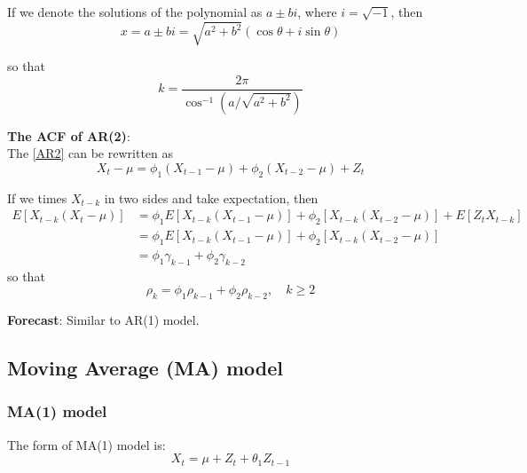 \documentclass{article}
\begin{document}
\noindent If we denote the solutions of the polynomial as $a \pm b i$, where $i = \sqrt{-1}$, then
\begin{equation*}
x = a \pm b i = \sqrt{a^2 + b^2} (\cos \theta + i \sin \theta)
\end{equation*}

\noindent so that
\begin{equation*}
k=\frac{2 \pi}{\cos ^{-1}\left(a / \sqrt{a^{2}+b^{2}}\right)}
\end{equation*}

\noindent \textbf{The ACF of AR(2)}:\\

\noindent The \eqref{AR2} can be rewritten as
\begin{equation*}
X_{t} - \mu = \phi_{1} (X_{t-1} - \mu) + \phi_{2} (X_{t-2} - \mu) + Z_{t}
\end{equation*}

\noindent If we times $X_{t-k}$ in two sides and take expectation, then
\begin{equation*}
\begin{array}{ll} {E\left[X_{t-k}\left(X_{t}-\mu\right)\right] } & = {\phi_{1} E\left[X_{t-k}\left(X_{t-1}-\mu\right)\right] + \phi_{2} \left[X_{t-k}(X_{t-2} - \mu)\right] + E\left[Z_tX_{t-k}\right]}\\ & = {\phi_{1} E\left[X_{t-k}\left(X_{t-1}-\mu\right)\right] + \phi_{2} \left[X_{t-k}(X_{t-2} - \mu)\right]}\\ & = {\phi_1 \gamma_{k-1} + \phi_2 \gamma_{k-2}}
\end{array}
\end{equation*}
so that
\begin{equation*}
\rho_{k}=\phi_{1} \rho_{k-1}+\phi_{2} \rho_{k-2}, \quad k \geq 2
\end{equation*}

\noindent \textbf{Forecast}: Similar to AR(1) model.

\subsection{Moving Average (MA) model}
\subsubsection{MA(1) model}
The form of MA(1) model is:
\begin{equation}\label{MA1}
X_t = \mu + Z_t + \theta_1 Z_{t-1}
\end{equation}
\end{document}
